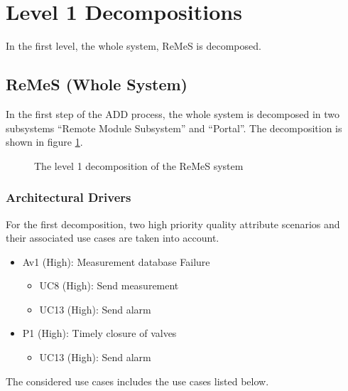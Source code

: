 \section{Level 1 Decompositions}
\label{sec:level-1}

\npar In the first level, the whole system, ReMeS is decomposed. 

\subsection{ReMeS (Whole System)}
\label{dec:whole-system}

\npar In the first step of the ADD process, the whole system is decomposed in
two subsystems ``Remote Module Subsystem'' and ``Portal''. The decomposition is
shown in figure \ref{fig:dec/level-1}.

\begin{figure}[H]
	\begin{centering}
		\caption{The level 1 decomposition of the ReMeS system}
		\label{fig:dec/level-1}
	\end{centering}
\end{figure}

\subsubsection{Architectural Drivers}
\label{drivers:whole-system}

\npar For the first decomposition, two high priority quality attribute scenarios
and their associated use cases are taken into account. 

\begin{itemize}
 	\item Av1 (High): Measurement database Failure
 	\begin{itemize}
 		\item UC8 (High): Send measurement
 		\item UC13 (High): Send alarm 
 	\end{itemize}
  	\item P1 (High): Timely closure of valves
  	\begin{itemize}
  		\item UC13 (High): Send alarm 
  	\end{itemize}
\end{itemize}

\npar The considered use cases includes the use cases listed below. 

